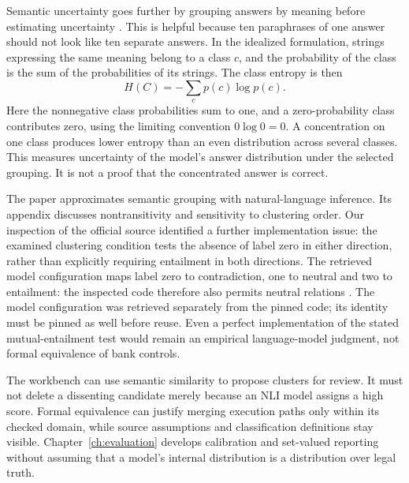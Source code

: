 Semantic uncertainty goes further by grouping answers by meaning before
estimating uncertainty \citep[sections 3--4]{semantic2023}. This is helpful because
ten paraphrases of one answer should not look like ten separate answers. In the
idealized formulation, strings expressing the same meaning belong to a class
$c$, and the probability of the class is the sum of the probabilities of its
strings. The class entropy is then
\begin{equation}
 H(C)=-\sum_c p(c)\log p(c).
 \label{eq:semantic-entropy}
\end{equation}
Here the nonnegative class probabilities sum to one, and a zero-probability
class contributes zero, using the limiting convention $0\log 0=0$.
A concentration on one class produces lower entropy than an even distribution
across several classes. This measures uncertainty of the model's answer
distribution under the selected grouping. It is not a proof that the concentrated
answer is correct.


The paper approximates semantic grouping with natural-language inference. Its
appendix discusses nontransitivity and sensitivity to clustering order. Our
inspection of the official source identified a further implementation issue: the
examined clustering condition tests the absence of label zero in either direction,
rather than explicitly requiring entailment in both directions. The retrieved model configuration maps label zero to contradiction, one to
neutral and two to entailment: the inspected code therefore also permits neutral
relations \citep{semanticcode2023,debertaconfig}. The model configuration was retrieved separately from the pinned code;
its identity must be pinned as well before reuse. Even a
perfect implementation of the stated mutual-entailment test would remain an
empirical language-model judgment, not formal equivalence of bank controls.

The workbench can use semantic similarity to propose clusters for review. It
must not delete a dissenting candidate merely because an NLI model assigns a
high score. Formal equivalence can justify merging execution paths only within
its checked domain, while source assumptions and classification definitions stay
visible. Chapter~\ref{ch:evaluation} develops calibration and set-valued reporting
without assuming that a model's internal distribution is a distribution over
legal truth.

